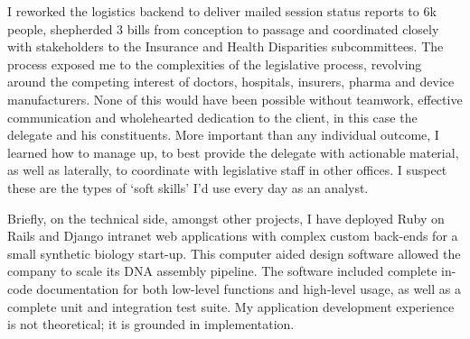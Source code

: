 \documentclass[a4paper]{../res}
\begin{document}
\begin{sloppypar}
\begin{resume}
I reworked the logistics backend to deliver mailed session status reports to 6k people, shepherded 3 bills from conception to passage and coordinated closely with stakeholders to the Insurance and Health Disparities subcommittees. The process exposed me to the complexities of the legislative process, revolving around the competing interest of doctors, hospitals, insurers, pharma and device manufacturers. None of this would have been possible without teamwork, effective communication and wholehearted dedication to the client, in this case the delegate and his constituents. More important than any individual outcome, I learned how to manage up, to best provide the delegate with actionable material, as well as laterally, to coordinate with legislative staff in other offices. I suspect these are the types of `soft skills' I'd use every day as an analyst.

Briefly, on the technical side, amongst other projects, I have deployed Ruby on Rails and Django intranet web applications with complex custom back-ends for a small synthetic biology start-up. This computer aided design software allowed the company to scale its DNA assembly pipeline. The software included complete in-code documentation for both low-level functions and high-level usage, as well as a complete unit and integration test suite. My application development experience is not theoretical; it is grounded in implementation.







\end{resume}
\end{sloppypar}
\end{document}
